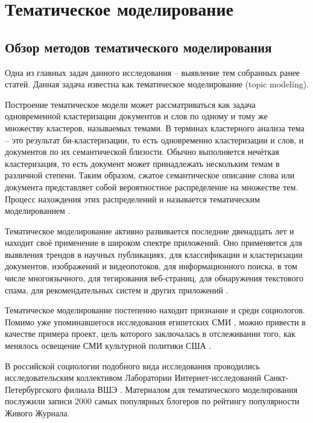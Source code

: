 \section{Тематическое моделирование}

\subsection{Обзор методов тематического моделирования}
Одна из главных задач данного исследования -- выявление тем собранных ранее статей. Данная задача известна как тематическое моделирование (topic modeling).

Построение тематическое модели может рассматриваться как задача одновременной кластеризации документов и слов по одному и тому же множеству кластеров, называемых темами. В терминах кластерного анализа тема -- это результат би-кластеризации, то есть одновременно кластеризации и слов, и документов по их семантической близости. Обычно выполняется нечёткая кластеризация, то есть документ может принадлежать нескольким темам в различной степени. Таким образом, сжатое семантическое описание слова или документа представляет собой вероятностное распределение на множестве тем. Процесс нахождения этих распределений и называется тематическим моделированием \cite{korshunov2012}.

Тематическое моделирование активно развивается последние двенадцать лет и находит своё применение в широком спектре приложений. Оно применяется для выявления трендов в научных публикациях, для классификации и кластеризации документов, изображений и видеопотоков, для информационного поиска, в том числе многоязычного, для тегирования веб-страниц, для обнаружения текстового спама, для рекомендательных систем и других приложений \cite[стр. 4]{voroncov2013}. 

Тематическое моделирование постепенно находит признание и среди социологов. Помимо уже упоминавшегося исследования египетских СМИ \cite{EgyptianUprising2012}, можно привести в качестве примера проект, цель которого заключалась в отслеживании того, как менялось освещение СМИ культурной политики США \cite{poetics_topics}.

В российской социологии подобного вида исследования проводились исследовательским коллективом Лаборатории Интернет-исследований Санкт-Петербургского филиала ВШЭ \cite{kolcovalda}. Материалом для тематического моделирования послужили записи 2000 самых популярных блогеров по рейтингу популярности Живого Журнала. %

